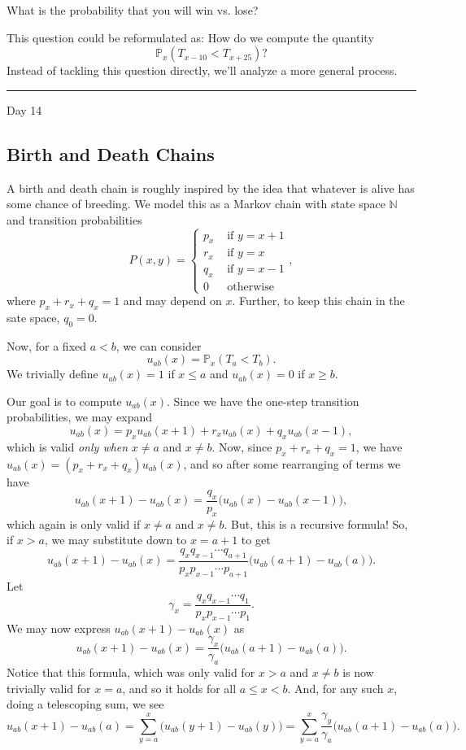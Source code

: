 \documentclass{problemset}
\newcommand{\N}{\mathbb{N}}
\renewcommand{\P}{\mathbb{P}}
\newcommand{\fatrule}[1]{\vspace{.3cm}\hrule {\hfill \sf #1}\par}
\begin{document}
	What is the probability that you will win vs\mbox{.} lose?

	This question could be reformulated as: How do we compute the quantity
	\[
		\P_x(T_{x-10} < T_{x+25})?
	\]
	Instead of tackling this question directly, we'll analyze a more general process.

	\fatrule{Day 14}
\subsection*{Birth and Death Chains}
	A birth and death chain is roughly inspired by the idea that whatever is alive
	has some chance of breeding.  We model this as a Markov chain with state space $\N$
	and transition probabilities
	\[
		P(x,y) = \begin{cases}
			p_x &\text{ if }y=x+1\\
			r_x &\text{ if }y=x\\
			q_x &\text{ if }y=x-1\\
			0 &\text{ otherwise }
		\end{cases},
	\]
	where $p_x+r_x+q_x=1$ and may depend on $x$.  Further, to keep this chain in the sate space, $q_0=0$.

	Now, for a fixed $a<b$, we can consider
	\[
		u_{ab}(x) = \P_x(T_a < T_b).
	\]
	We trivially define $u_{ab}(x) = 1$ if $x\leq a$ and $u_{ab}(x)=0$ if $x\geq b$.

	Our goal is to compute $u_{ab}(x)$.  Since we have the one-step transition
	probabilities, we may expand
	\[
		u_{ab}(x) = p_xu_{ab}(x+1)+r_xu_{ab}(x)+q_xu_{ab}(x-1),
	\]
	which is valid \emph{only when} $x\neq a$ and $x\neq b$.  Now, since $p_x+r_x+q_x=1$, 
	we have $u_{ab}(x)  = (p_x+r_x+q_x)u_{ab}(x)$, and so after some rearranging of terms
	we have
	\[
		u_{ab}(x+1)-u_{ab}(x) = \frac{q_x}{p_x}\Big(u_{ab}(x)-u_{ab}(x-1)\Big),
	\]
	which again is only valid if $x\neq a$ and $x\neq b$.  But, this is a recursive formula!
	So, if $x>a$, we may substitute down to $x=a+1$ to get
	\[
		u_{ab}(x+1)-u_{ab}(x) = \frac{q_xq_{x-1}\cdots q_{a+1}}{p_xp_{x-1}\cdots p_{a+1}}\Big(u_{ab}(a+1)-u_{ab}(a)\Big).
	\]
	Let
	\[
		\gamma_x = \frac{q_xq_{x-1}\cdots q_{1}}{p_xp_{x-1}\cdots p_{1}}.
	\]
	We may now express $u_{ab}(x+1)-u_{ab}(x)$ as
	\[
		u_{ab}(x+1)-u_{ab}(x) = \frac{\gamma_x}{\gamma_a}\Big(u_{ab}(a+1)-u_{ab}(a)\Big).
	\]
	Notice that this formula, which was only valid for $x> a$ and $x\neq b$ is now trivially valid for $x=a$, 
	and so it holds for all $a\leq x < b$.  And, for any such $x$, doing a telescoping sum, we see
	\[
		u_{ab}(x+1)-u_{ab}(a) = \sum_{y=a}^x \Big(u_{ab}(y+1)-u_{ab}(y)\Big) = \sum_{y=a}^x \frac{\gamma_y}{\gamma_a}\Big(u_{ab}(a+1)-u_{ab}(a)\Big).
	\]
\end{document}
